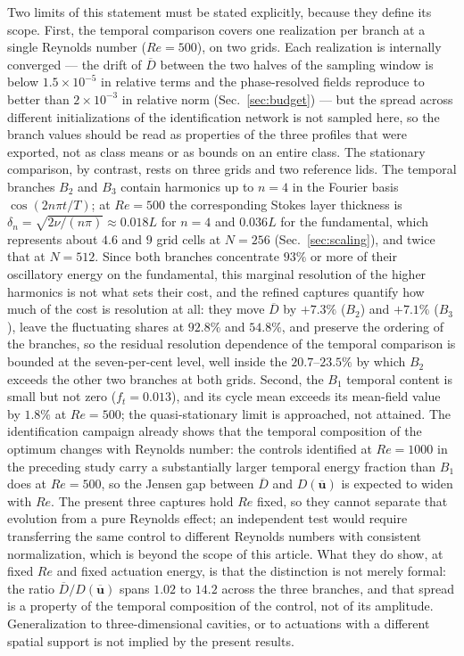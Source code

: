 \documentclass[11pt,a4paper]{article}
\newcommand{\Dbar}{\overline{D}}
\newenvironment{chgadd}{\par\color{blue}}{\par\color{black}}
\begin{document}
\begin{chgadd}
Two limits of this statement must be stated explicitly, because they define its
scope. First, the temporal comparison covers one realization per branch at a
single Reynolds number ($Re=500$), on two grids. Each realization is
internally converged --- the drift of $\Dbar$ between the two halves of the
sampling window is below
$1.5\times10^{-5}$ in relative terms and the phase-resolved fields reproduce to
better than $2\times10^{-3}$ in relative norm (Sec.~\ref{sec:budget}) --- but the
spread across different
initializations of the identification network is not sampled here, so the branch
values should be read as properties of the three profiles that were exported, not
as class means or as bounds on an entire class. The stationary
comparison, by contrast, rests on three grids and two reference lids. The temporal
branches $B_2$ and $B_3$ contain harmonics up to $n=4$ in the Fourier basis
$\cos(2n\pi t/T)$; at $Re=500$ the corresponding Stokes layer thickness is
$\delta_n=\sqrt{2\nu/(n\pi)}\approx0.018L$ for $n=4$ and $0.036L$ for the
fundamental, which represents about $4.6$ and $9$ grid cells at $N=256$
(Sec.~\ref{sec:scaling}), and twice that at $N=512$. Since both branches
concentrate $93\%$ or more of their oscillatory energy on the fundamental, this
marginal resolution of the higher harmonics is not what sets their cost, and the
refined captures quantify how much of the cost is resolution at all: they move
$\Dbar$ by $+7.3\%$ ($B_2$) and $+7.1\%$ ($B_3$), leave the fluctuating shares at
$92.8\%$ and $54.8\%$, and preserve the ordering of the branches, so the residual
resolution dependence of the temporal comparison is bounded at the seven-per-cent
level, well inside the $20.7$--$23.5\%$ by which $B_2$ exceeds the other two branches
at both grids. Second, the
$B_1$ temporal content is small but not zero ($f_t=0.013$), and its cycle mean
exceeds its mean-field value by $1.8\%$ at $Re=500$; the quasi-stationary limit is approached,
not attained. The identification campaign already shows that the temporal
composition of the optimum changes with Reynolds number: the controls identified at
$Re=1000$ in the preceding study \cite{beniaiche2026} carry a substantially larger
temporal energy fraction than $B_1$ does at $Re=500$, so the Jensen gap between
$\overline{D}$ and $D(\overline{\mathbf{u}})$ is expected to widen with $Re$. The
present three captures hold $Re$ fixed, so they cannot separate that evolution from
a pure Reynolds effect; an independent test would require transferring the same
control to different Reynolds numbers with consistent normalization, which is beyond
the scope of this article. What they do show, at fixed $Re$ and fixed actuation
energy, is that the distinction is not merely formal: the ratio
$\overline{D}/D(\overline{\mathbf{u}})$ spans $1.02$ to $14.2$ across the three
branches, and that spread is a property of the temporal composition of the control,
not of its amplitude. Generalization to three-dimensional cavities, or to actuations
with a different spatial support is not implied by the present results.
\end{chgadd}
\end{document}
